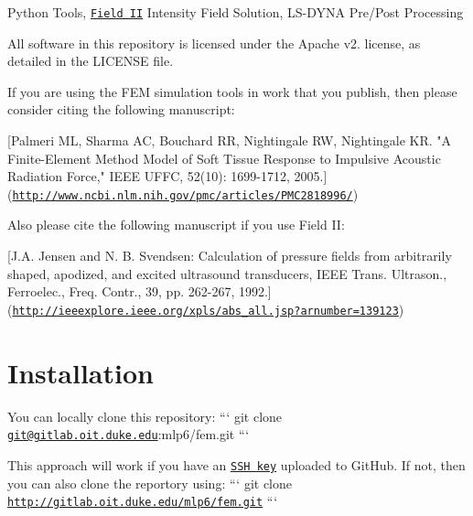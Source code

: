 Python Tools, \href{http://field-ii.dk}{\tt Field I\+I} Intensity Field Solution, L\+S-\/\+D\+Y\+N\+A Pre/\+Post Processing

All software in this repository is licensed under the Apache v2. license, as detailed in the L\+I\+C\+E\+N\+S\+E file.

If you are using the F\+E\+M simulation tools in work that you publish, then please consider citing the following manuscript\+:

\mbox{[}Palmeri M\+L, Sharma A\+C, Bouchard R\+R, Nightingale R\+W, Nightingale K\+R. "A Finite-\/\+Element Method Model of Soft Tissue Response to Impulsive Acoustic Radiation Force," I\+E\+E\+E U\+F\+F\+C, 52(10)\+: 1699-\/1712, 2005.\mbox{]}(\href{http://www.ncbi.nlm.nih.gov/pmc/articles/PMC2818996/}{\tt http\+://www.\+ncbi.\+nlm.\+nih.\+gov/pmc/articles/\+P\+M\+C2818996/})

Also please cite the following manuscript if you use Field I\+I\+:

\mbox{[}J.\+A. Jensen and N. B. Svendsen\+: Calculation of pressure fields from arbitrarily shaped, apodized, and excited ultrasound transducers, I\+E\+E\+E Trans. Ultrason., Ferroelec., Freq. Contr., 39, pp. 262-\/267, 1992.\mbox{]}(\href{http://ieeexplore.ieee.org/xpls/abs_all.jsp?arnumber=139123}{\tt http\+://ieeexplore.\+ieee.\+org/xpls/abs\+\_\+all.\+jsp?arnumber=139123})

\section*{Installation }


\begin{DoxyItemize}
\item You can locally clone this repository\+: ``` git clone \href{mailto:git@gitlab.oit.duke.edu}{\tt git@gitlab.\+oit.\+duke.\+edu}\+:mlp6/fem.\+git ```
\end{DoxyItemize}

This approach will work if you have an \href{https://help.github.com/articles/generating-ssh-keys}{\tt S\+S\+H key} uploaded to Git\+Hub. If not, then you can also clone the reportory using\+: ``` git clone \href{http://gitlab.oit.duke.edu/mlp6/fem.git}{\tt http\+://gitlab.\+oit.\+duke.\+edu/mlp6/fem.\+git} ```


